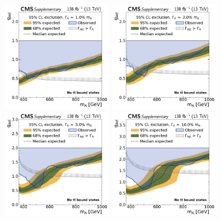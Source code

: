 \begin{figure}[!ph]
    \centering
    \includegraphics[width=0.42\textwidth]{figures/ah/lim1D/smtt/ll/A_limit_w1p0_g-scan.pdf}%
    \hspace*{0.05\textwidth}%
    \includegraphics[width=0.42\textwidth]{figures/ah/lim1D/smtt/ll/A_limit_w2p0_g-scan.pdf} \\
    \includegraphics[width=0.42\textwidth]{figures/ah/lim1D/smtt/ll/A_limit_w5p0_g-scan.pdf}%
    \hspace*{0.05\textwidth}%
    \includegraphics[width=0.42\textwidth]{figures/ah/lim1D/smtt/ll/A_limit_w10p0_g-scan.pdf}

\end{figure}

